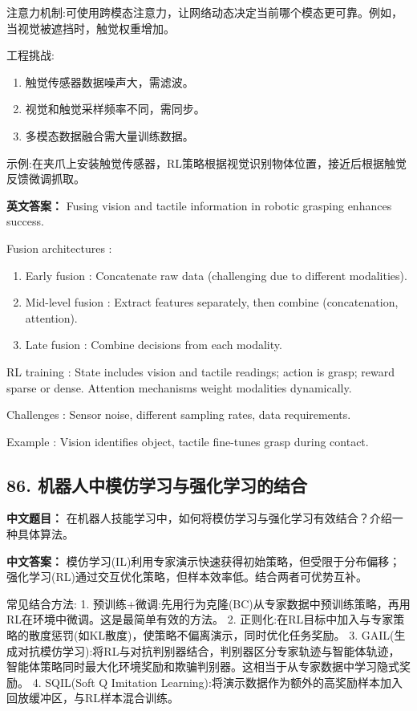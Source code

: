 \documentclass[10pt,a4paper]{ctexart}
\begin{document}
 注意力机制:可使用跨模态注意力，让网络动态决定当前哪个模态更可靠。例如，当视觉被遮挡时，触觉权重增加。

 工程挑战:
\begin{enumerate}
    \item 触觉传感器数据噪声大，需滤波。
    \item 视觉和触觉采样频率不同，需同步。
    \item 多模态数据融合需大量训练数据。
\end{enumerate}

 示例:在夹爪上安装触觉传感器，RL策略根据视觉识别物体位置，接近后根据触觉反馈微调抓取。

\textbf{英文答案：}  
Fusing vision and tactile information in robotic grasping enhances success.

 Fusion architectures :
\begin{enumerate}
    \item Early fusion : Concatenate raw data (challenging due to different modalities).
    \item Mid-level fusion : Extract features separately, then combine (concatenation, attention).
    \item Late fusion : Combine decisions from each modality.
\end{enumerate}

 RL training : State includes vision and tactile readings; action is grasp; reward sparse or dense. Attention mechanisms weight modalities dynamically.

 Challenges : Sensor noise, different sampling rates, data requirements.

 Example : Vision identifies object, tactile fine-tunes grasp during contact.

\subsection*{86. 机器人中模仿学习与强化学习的结合}
\textbf{中文题目：} 在机器人技能学习中，如何将模仿学习与强化学习有效结合？介绍一种具体算法。

\textbf{中文答案：}  
模仿学习(IL)利用专家演示快速获得初始策略，但受限于分布偏移；强化学习(RL)通过交互优化策略，但样本效率低。结合两者可优势互补。

 常见结合方法:
1.  预训练+微调:先用行为克隆(BC)从专家数据中预训练策略，再用RL在环境中微调。这是最简单有效的方法。
2.  正则化:在RL目标中加入与专家策略的散度惩罚(如KL散度)，使策略不偏离演示，同时优化任务奖励。
3.  GAIL(生成对抗模仿学习):将RL与对抗判别器结合，判别器区分专家轨迹与智能体轨迹，智能体策略同时最大化环境奖励和欺骗判别器。这相当于从专家数据中学习隐式奖励。
4.  SQIL(Soft Q Imitation Learning):将演示数据作为额外的高奖励样本加入回放缓冲区，与RL样本混合训练。
\end{document}
